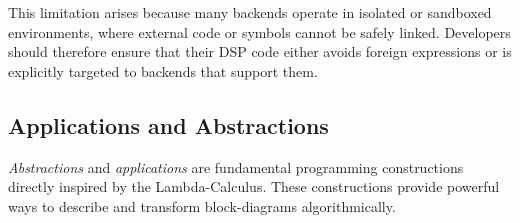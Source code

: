 This limitation arises because many backends operate in isolated or sandboxed environments, where external code or symbols cannot be safely linked. Developers should therefore ensure that their DSP code either avoids foreign expressions or is explicitly targeted to backends that support them.

%  









\subsection{Applications and Abstractions}

\textit{Abstractions} and \textit{applications} are fundamental programming constructions directly inspired by the Lambda-Calculus. These constructions provide powerful ways to describe and transform block-diagrams algorithmically.


